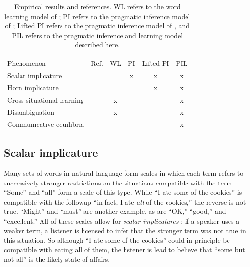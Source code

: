 \documentclass{article} %
\begin{document}
\begin{table}[t]
\label{tab:results}
\begin{center}
\begin{tabular}{lccccc}
\hline \\
Phenomenon & Ref. & WL & PI & Lifted PI  & PIL \\
\hline
Scalar implicature & \cite{grice1975} &  & x &x & x\\
Horn implicature & \cite{horn1984} & &  & x& x\\
Cross-situational learning & \cite{smith2008} & x& & & x \\
Disambiguation & \cite{markman1988} &x  & & & x \\
Communicative equilibria & \cite{galantucci2005} & & & & x \\
\hline
\end{tabular}
\end{center}
\caption{Empirical results and references. WL refers to the word learning model of \cite{frank2009}; PI refers to the pragmatic inference model of \cite{frank2012}; Lifted PI refers to the pragmatic inference model of \cite{bergen2012}, and PIL refers to the pragmatic inference and learning model described here.  }

\end{table}


\subsection{Scalar implicature}

Many sets of words in natural language form scales in which each term refers to successively stronger restrictions on the situations compatible with the term. ``Some'' and ``all'' form a scale of this type. While ``I ate some of the cookies'' is compatible with the followup ``in fact, I ate {\it all} of the cookies,'' the reverse is not true. ``Might'' and ``must'' are another example, as are ``OK,'' ``good,'' and ``excellent.'' All of these scales allow for {\it scalar implicatures} \cite{grice1975}: if a speaker uses a weaker term, a listener is licensed to infer that the stronger term was not true in this situation. So although ``I ate some of the cookies'' could in principle be compatible with eating all of them, the listener is lead to believe that ``some but not all'' is the likely state of affairs. 
\end{document}
